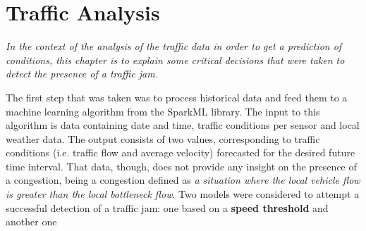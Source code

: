 \chapter{Traffic Analysis}
\textit{In the context of the analysis of the traffic data in order to get a prediction of conditions, this chapter is to explain some critical decisions that were taken to detect the presence of a traffic jam.}

The first step that was taken was to process historical data and feed them to a machine learning algorithm from the SparkML library. The input to this algorithm is data containing date and time, traffic conditions per sensor and local weather data. The output consists of two values, corresponding to traffic conditions (i.e. traffic flow and average velocity) forecasted for the desired future time interval. That data, though, does not provide any insight on the presence of a congestion, being a congestion defined as \textit{a situation where the local vehicle flow is greater than the local bottleneck flow}. Two models were considered to attempt a successful detection of a traffic jam: one based on a \textbf{speed threshold} and another one 